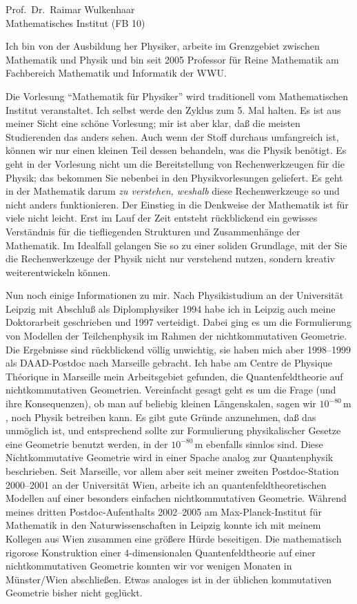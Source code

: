\documentclass[12pt,a4paper,twocolumn]{article}
\begin{document}
{\large\noindent Prof.\ Dr.\ Raimar Wulkenhaar\\
Mathematisches Institut (FB 10)}

\bigskip

\noindent
Ich bin von der Ausbildung her Physiker, arbeite im Grenzgebiet
zwischen Mathematik und Physik und bin seit 2005 Professor für Reine
Mathematik am Fachbereich Mathematik und Informatik der WWU. 

Die Vorlesung ``Mathematik für Physiker'' wird traditionell vom
Mathematischen Institut veranstaltet. Ich selbst werde den Zyklus zum
5. Mal halten.  Es ist aus meiner Sicht eine schöne Vorlesung; mir ist
aber klar, daß die meisten Studierenden das anders sehen. Auch wenn
der Stoff durchaus umfangreich ist, können wir nur einen kleinen Teil
dessen behandeln, was die Physik benötigt. Es geht in der Vorlesung
nicht um die Bereitstellung von Rechenwerkzeugen für die Physik; das
bekommen Sie nebenbei in den Physikvorlesungen geliefert. Es geht in
der Mathematik darum \emph{zu verstehen, weshalb} diese
Rechenwerkzeuge so und nicht anders funktionieren. Der Einstieg in die
Denkweise der Mathematik ist für viele nicht leicht. Erst im Lauf der
Zeit entsteht rückblickend ein gewisses Verständnis für die
tief\/liegenden Strukturen und Zusammenhänge der Mathematik. Im
Idealfall gelangen Sie so zu einer soliden Grundlage, mit der Sie die
Rechenwerkzeuge der Physik nicht nur verstehend nutzen, sondern
kreativ weiterentwickeln können.

Nun noch einige Informationen zu mir. Nach Physikistudium an der
Universität Leipzig mit Abschluß als Diplomphysiker 1994 habe ich in
Leipzig auch meine Doktorarbeit geschrieben und 1997 verteidigt. Dabei
ging es um die Formulierung von Modellen der Teilchenphysik im Rahmen
der nichtkommutativen Geometrie. Die Ergebnisse sind rückblickend
völlig unwichtig, sie haben mich aber 1998--1999 als DAAD-Postdoc nach
Marseille gebracht.  Ich habe am Centre de Physique Théorique in
Marseille mein Arbeitsgebiet gefunden, die Quantenfeldtheorie auf
nichtkommutativen Geometrien. Vereinfacht gesagt geht es um die Frage
(und ihre Konsequenzen), ob man auf beliebig kleinen Längenskalen,
sagen wir $10^{-80}\,\mathrm{m}$, noch Physik betreiben kann. Es gibt
gute Gründe anzunehmen, daß das unmöglich ist, und entsprechend sollte
zur Formulierung physikalischer Gesetze eine Geometrie benutzt werden,
in der $10^{-80}\,\mathrm{m}$ ebenfalls sinnlos sind. Diese
Nichtkommutative Geometrie wird in einer Spache analog zur
Quantenphysik beschrieben. Seit Marseille, vor allem aber seit meiner
zweiten Postdoc-Station 2000--2001 an der Universität Wien, arbeite
ich an quantenfeldtheoretischen Modellen auf einer besonders einfachen
nichtkommutativen Geometrie. Während meines dritten
Postdoc-Aufenthalts 2002--2005 am Max-Planck-Institut für Mathematik
in den Naturwissenschaften in Leipzig konnte ich mit meinem Kollegen
aus Wien zusammen eine größere Hürde beseitigen. Die mathematisch
rigorose Konstruktion einer 4-dimensionalen Quantenfeldtheorie auf
einer nichtkommutativen Geometrie konnten wir vor wenigen Monaten in
Münster/\mbox{Wien} abschließen. Etwas analoges ist in der üblichen
kommutativen Geometrie bisher nicht geglückt.
\end{document}
